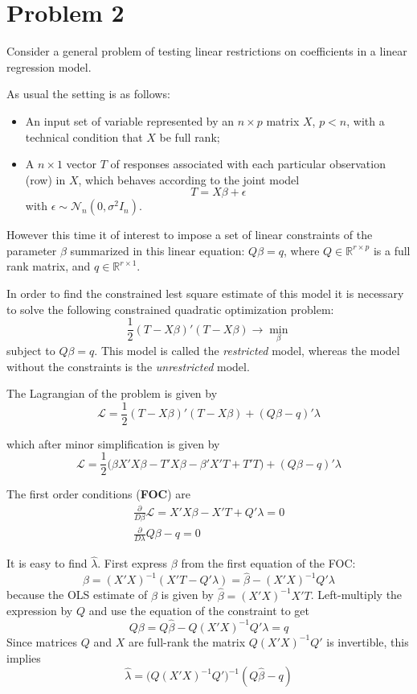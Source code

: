 \documentclass[a4paper]{article}
\newcommand{\Real}{\mathbb{R}}
\begin{document}


\clearpage

\section{Problem 2} %
\label{sec:problem_2}

Consider a general problem of testing linear restrictions on coefficients in a linear regression model.

As usual the setting is as follows: \begin{itemize}
	\item An input set of variable represented by an $n\times p$ matrix $X$, $p<n$, with a technical condition that $X$ be full rank;
	\item A $n\times 1$ vector $T$ of responses associated with each particular observation (row) in $X$, which behaves according to the joint model
	\[T = X\beta + \epsilon\]
	with $\epsilon\sim\mathcal{N}_n(0,\sigma^2 I_n)$.
\end{itemize}

However this time it of interest to impose a set of linear constraints of the parameter $\beta$ summarized in this linear equation: $Q\beta = q$, where $Q\in \Real^{r\times p}$ is a full rank matrix, and $q\in \Real^{r\times 1}$.

In order to find the constrained lest square estimate of this model it is necessary to solve the following constrained quadratic optimization problem:
\[\frac{1}{2} (T - X\beta)'(T - X\beta) \to \min_\beta\]
subject to $Q\beta = q$. This model is called the \emph{restricted} model, whereas the model without the constraints is the \emph{unrestricted} model.


The Lagrangian of the problem is given by 
\[\mathcal{L} = \frac{1}{2} (T - X\beta)'(T - X\beta) + (Q\beta - q)'\lambda\]

which after minor simplification is given by
\[\mathcal{L} = \frac{1}{2}\big(\beta X'X\beta - T'X\beta - \beta'X'T + T'T\big) + (Q\beta - q)'\lambda\]

The first order conditions (\textbf{FOC}) are
\begin{align*}
	\frac{\partial}{D\beta} \mathcal{L} = X'X\beta - X'T + Q'\lambda = 0\\
	\frac{\partial}{D\lambda} Q\beta - q = 0
\end{align*}

It is easy to find $\hat{\lambda}$. First express $\beta$ from the first equation of the FOC:
\[\beta = (X'X)^{-1}(X'T - Q'\lambda) = \hat{\beta} - (X'X)^{-1}Q'\lambda\]
because the OLS estimate of $\beta$ is given by $\hat{\beta} = (X'X)^{-1}X'T$.
Left-multiply the expression by $Q$ and use the equation of the constraint to get
\[Q\beta = Q \hat{\beta} - Q(X'X)^{-1}Q'\lambda = q\]
Since matrices $Q$ and $X$ are full-rank the matrix $Q(X'X)^{-1}Q'$ is invertible, this implies
\[\hat{\lambda} = \big(Q(X'X)^{-1}Q'\big)^{-1}(Q\hat{\beta}-q)\]
\end{document}
